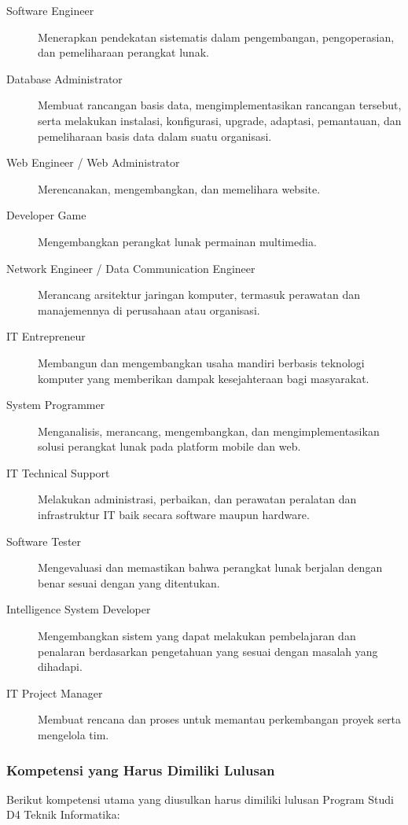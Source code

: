 \begin{description}
\item[Software Engineer] Menerapkan pendekatan sistematis dalam pengembangan, pengoperasian, dan pemeliharaan perangkat lunak.
\item[Database Administrator] Membuat rancangan basis data, mengimplementasikan rancangan tersebut, serta melakukan instalasi, konfigurasi, upgrade, adaptasi, pemantauan, dan pemeliharaan basis data dalam suatu organisasi.
\item[Web Engineer / Web Administrator] Merencanakan, mengembangkan, dan memelihara website.
\item[Developer Game] Mengembangkan perangkat lunak permainan multimedia.
\item[Network Engineer / Data Communication Engineer] Merancang arsitektur jaringan komputer, termasuk perawatan dan manajemennya di perusahaan atau organisasi.
\item[IT Entrepreneur] Membangun dan mengembangkan usaha mandiri berbasis teknologi komputer yang memberikan dampak kesejahteraan bagi masyarakat.
\item[System Programmer] Menganalisis, merancang, mengembangkan, dan mengimplementasikan solusi perangkat lunak pada platform mobile dan web.
\item[IT Technical Support] Melakukan administrasi, perbaikan, dan perawatan peralatan dan infrastruktur IT baik secara software maupun hardware.
\item[Software Tester] Mengevaluasi dan memastikan bahwa perangkat lunak berjalan dengan benar sesuai dengan yang ditentukan.
\item[Intelligence System Developer] Mengembangkan sistem yang dapat melakukan pembelajaran dan penalaran berdasarkan pengetahuan yang sesuai dengan masalah yang dihadapi.
\item[IT Project Manager] Membuat rencana dan proses untuk memantau perkembangan proyek serta mengelola tim.
\end{description}

\subsubsection{Kompetensi yang Harus Dimiliki Lulusan}

Berikut kompetensi utama yang diusulkan harus dimiliki lulusan Program Studi D4 Teknik Informatika:

